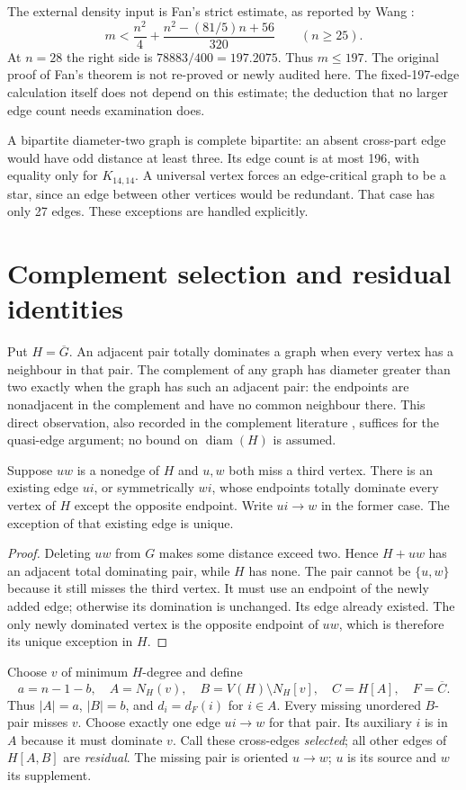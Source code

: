 \documentclass[11pt,a4paper]{article}
\DeclareMathOperator{\diam}{diam}
\begin{document}
The external density input is Fan's strict estimate, as reported by Wang \cite[p.~2]{wang}:
\begin{equation}\label{eq:fan}
m<\frac{n^2}{4}+\frac{n^2-(81/5)n+56}{320}\qquad(n\ge25).
\end{equation}
At $n=28$ the right side is $78883/400=197.2075$. Thus $m\le197$. The original proof of Fan's theorem is not re-proved or newly audited here. The fixed-197-edge calculation itself does not depend on this estimate; the deduction that no larger edge count needs examination does.

A bipartite diameter-two graph is complete bipartite: an absent cross-part edge would have odd distance at least three. Its edge count is at most 196, with equality only for $K_{14,14}$. A universal vertex forces an edge-critical graph to be a star, since an edge between other vertices would be redundant. That case has only 27 edges. These exceptions are handled explicitly.

\section{Complement selection and residual identities}\label{sec:setup}
Put $H=\overline G$. An adjacent pair totally dominates a graph when every vertex has a neighbour in that pair. The complement of any graph has diameter greater than two exactly when the graph has such an adjacent pair: the endpoints are nonadjacent in the complement and have no common neighbour there. This direct observation, also recorded in the complement literature \cite{wang,haynes}, suffices for the quasi-edge argument; no bound on $\diam(H)$ is assumed.
\begin{lemma}\label{lem:quasi}
Suppose $uw$ is a nonedge of $H$ and $u,w$ both miss a third vertex. There is an existing edge $ui$, or symmetrically $wi$, whose endpoints totally dominate every vertex of $H$ except the opposite endpoint. Write $ui\to w$ in the former case. The exception of that existing edge is unique.
\end{lemma}
\begin{proof}
Deleting $uw$ from $G$ makes some distance exceed two. Hence $H+uw$ has an adjacent total dominating pair, while $H$ has none. The pair cannot be $\{u,w\}$ because it still misses the third vertex. It must use an endpoint of the newly added edge; otherwise its domination is unchanged. Its edge already existed. The only newly dominated vertex is the opposite endpoint of $uw$, which is therefore its unique exception in $H$.
\end{proof}
Choose $v$ of minimum $H$-degree and define
\[
 a=n-1-b,\quad A=N_H(v),\quad B=V(H)\setminus N_H[v],\quad
 C=H[A],\quad F=\overline C.
\]
Thus $|A|=a$, $|B|=b$, and $d_i=d_F(i)$ for $i\in A$. Every missing unordered $B$-pair misses $v$. Choose exactly one edge $ui\to w$ for that pair. Its auxiliary $i$ is in $A$ because it must dominate $v$. Call these cross-edges \emph{selected}; all other edges of $H[A,B]$ are \emph{residual}. The missing pair is oriented $u\to w$; $u$ is its source and $w$ its supplement.
\end{document}
